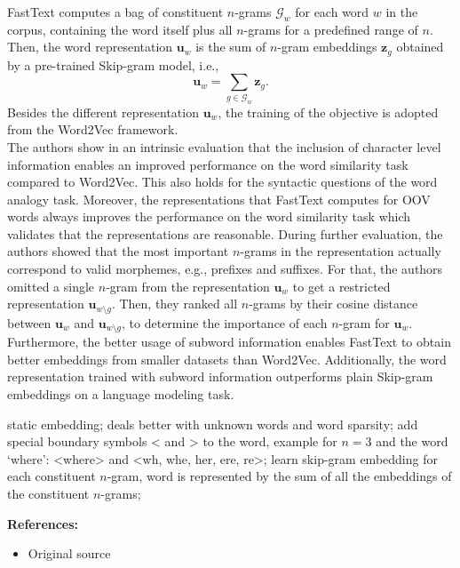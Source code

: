 \documentclass[11pt, a4paper]{amsart}
\begin{document}
FastText computes a bag of constituent $n$-grams $\mathcal{G}_w$ for each word $w$ in the corpus, containing the word itself plus all $n$-grams for a predefined range of $n$. Then, the word representation $\textbf{u}_w$ is the sum of $n$-gram embeddings $\textbf{z}_g$ obtained by a pre-trained Skip-gram model, i.e.,
\begin{equation}
	\textbf{u}_w = \sum_{g \in \mathcal{G}_w} \textbf{z}_g.
\end{equation}
Besides the different representation $\textbf{u}_w$, the training of the objective is adopted from the Word2Vec framework.\\

The authors show in an intrinsic evaluation that the inclusion of character level information enables an improved performance on the word similarity task compared to Word2Vec. This also holds for the syntactic questions of the word analogy task. Moreover, the representations that FastText computes for OOV words always improves the performance on the word similarity task which validates that the representations are reasonable. During further evaluation, the authors showed that the most important $n$-grams in the representation actually correspond to valid morphemes, e.g., prefixes and suffixes. For that, the authors omitted a single $n$-gram from the representation $\textbf{u}_w$ to get a restricted representation $\textbf{u}_{w\setminus g}$. Then, they ranked all $n$-grams by their cosine distance between $\textbf{u}_w$ and $\textbf{u}_{w\setminus g}$, to determine the importance of each $n$-gram for $\textbf{u}_w$. Furthermore, the better usage of subword information enables FastText to obtain better embeddings from smaller datasets than Word2Vec. Additionally, the word representation trained with subword information outperforms plain Skip-gram embeddings on a language modeling task.

{
	\color{blue}
	
	static embedding;
	deals better with unknown words and word sparsity;
	add special boundary symbols < and > to the word,
	example for $n=3$ and the word `where':
	<where> and <wh, whe, her, ere, re>;
	learn skip-gram embedding for each constituent $n$-gram, word is represented by the sum of all the embeddings of the constituent $n$-grams;
} %

\noindent \textbf{References:}
\begin{itemize}
	\item Original source \cite{DBLP:journals/corr/BojanowskiGJM16}
\end{itemize}
\end{document}
